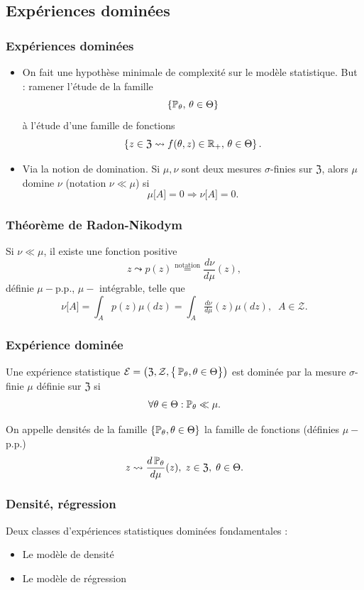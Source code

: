 \subsection{Expériences dominées}
\begin{frame}
\frametitle{Expériences dominées}
\begin{itemize}
\item On fait une hypothèse minimale de \og complexité \fg{} sur le modèle statistique. \alert{ But} : ramener l'étude de la famille
$$\{\operatorname{{\mathbb P}}_\theta,\,\theta \in \Theta\}$$
à l'étude d'une famille de fonctions
$$\left\{z \in \mathfrak{Z} \leadsto f(\theta,z) \in \operatorname{{\mathbb R}}_+,\,\theta \in \Theta\right\}.$$
\item Via la notion de \alert{ domination}. Si $\mu,\nu$ sont deux mesures $\sigma$-finies sur $\mathfrak{Z}$, alors $\mu$ \alert{ domine} $\nu$ (notation $\nu \ll \mu$) si
$$\mu\big[A\big]=0 \Rightarrow \nu\big[A\big]=0.$$
\end{itemize}
\end{frame}
\begin{frame}
\frametitle{Théorème de Radon-Nikodym}
\begin{theo}
Si $\nu \ll \mu$, il existe une fonction positive
$$z \leadsto  p(z) \stackrel{\text{notation}}{=} \frac{d\nu}{d\mu}(z),$$ définie $\mu-$p.p., $\mu-$ intégrable, telle que
$$\nu\big[A\big] = \int_{A}p(z) \mu(dz) = \int_{A}\tfrac{d\nu}{d\mu}(z)\mu(dz),\;\;A \in {\mathcal Z}.$$
\end{theo}
\end{frame}
\begin{frame}
\frametitle{Expérience dominée}
\begin{df}
Une expérience statistique ${\mathcal E} = \big(\mathfrak{Z}, {\mathcal Z}, \big\{\operatorname{{\mathbb P}}_\theta, \theta \in \Theta\big\}\big)$ est \alert{dominée} par la mesure $\sigma$-finie $\mu$ définie sur $\mathfrak{Z}$ si
$$\forall \theta \in \Theta : \operatorname{{\mathbb P}}_\theta \ll \mu.$$
\end{df}
On appelle \alert{ densités} de la famille $\{\operatorname{{\mathbb P}}_\theta,\theta \in \Theta\}$ la famille de fonctions (définies $\mu-$ p.p.)
$$z\leadsto \frac{d\operatorname{{\mathbb P}}_\theta}{d\mu}(z),\;z\in \mathfrak{Z},\;\theta \in \Theta.$$
\end{frame}

\begin{frame}
\frametitle{Densité, régression}
Deux classes d'expériences statistiques \alert{dominées} fondamentales :
\begin{itemize}
\item Le modèle de \alert{ densité}
\item Le modèle de \alert{régression }
\end{itemize}
\end{frame}


